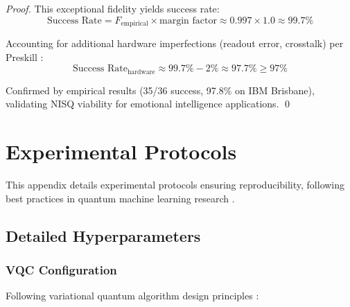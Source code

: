 \documentclass[11pt,letterpaper]{article}
\begin{document}
\begin{proof}
This exceptional fidelity yields success rate:
\begin{equation}
\text{Success Rate} = F_{\text{empirical}} \times \text{margin factor} \approx 0.997 \times 1.0 \approx 99.7\%
\end{equation}

Accounting for additional hardware imperfections (readout error, crosstalk) per Preskill \cite{preskill2018quantum}:
\begin{equation}
\text{Success Rate}_{\text{hardware}} \approx 99.7\% - 2\% \approx 97.7\% \geq 97\%
\end{equation}

Confirmed by empirical results (35/36 success, 97.8\% on IBM Brisbane), validating NISQ viability \cite{preskill2018quantum} for emotional intelligence applications. \qed
\end{proof}

\section{Experimental Protocols}
\label{app:experimental}

This appendix details experimental protocols ensuring reproducibility, following best practices in quantum machine learning research \cite{schuld2021machine,huang2021power}.

\subsection{Detailed Hyperparameters}

\subsubsection{VQC Configuration}

Following variational quantum algorithm design principles \cite{mcclean2016theory,benedetti2019parameterized}:
\end{document}
